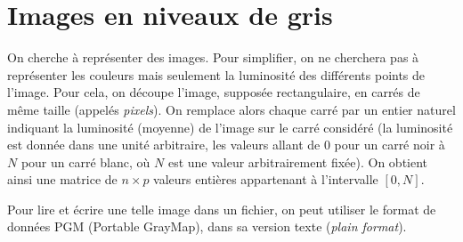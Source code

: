 \section{Images en niveaux de gris}

On cherche à représenter des  images. Pour simplifier, on ne cherchera
pas  à  représenter les  couleurs  mais  seulement  la luminosité  des
différents points de l'image.  Pour cela, on découpe l'image, supposée
rectangulaire,  en carrés  de même  taille (appelés \emph{pixels}). On
remplace  alors chaque
carré  par un  entier  naturel indiquant  la  luminosité (moyenne)  de
l'image sur le carré considéré (la luminosité est donnée dans une
unité arbitraire, les valeurs allant de $0$ pour un carré noir à $N$
pour un carré blanc, où $N$ est une valeur arbitrairement fixée). On
obtient ainsi une matrice de $n\times p$ valeurs entières appartenant
à l'intervalle $[0, N]$.

Pour lire et écrire une telle image dans un fichier, on peut utiliser
le format de données PGM (Portable GrayMap), dans sa version texte
(\textit{plain format}).

